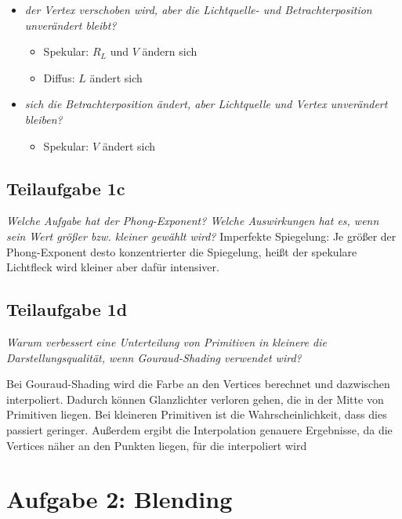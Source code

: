 \documentclass[a4paper]{scrartcl}
\begin{document}
\begin{itemize}
    \item \textit{der Vertex verschoben wird, aber die Lichtquelle- und
          Betrachterposition unverändert bleibt?}
          \begin{itemize}
              \item Spekular: $R_L$ und $V$ ändern sich
              \item Diffus: $L$ ändert sich
          \end{itemize}
    \item \textit{sich die Betrachterposition ändert, aber Lichtquelle und Vertex unverändert bleiben?}
          \begin{itemize}
              \item Spekular: $V$ ändert sich
          \end{itemize}
\end{itemize}

\subsection*{Teilaufgabe 1c}
\textit{Welche Aufgabe hat der Phong-Exponent? Welche Auswirkungen hat es, wenn sein
Wert größer bzw. kleiner gewählt wird?}
Imperfekte Spiegelung: Je größer der Phong-Exponent desto konzentrierter die Spiegelung, heißt der spekulare Lichtfleck wird kleiner aber dafür intensiver.

\subsection*{Teilaufgabe 1d}
\textit{Warum verbessert eine Unterteilung von Primitiven in kleinere die Darstellungsqualität, wenn Gouraud-Shading verwendet wird?}

Bei Gouraud-Shading wird die Farbe an den Vertices berechnet und dazwischen
interpoliert. Dadurch können Glanzlichter verloren gehen, die in der Mitte von
Primitiven liegen. Bei kleineren Primitiven ist die Wahrscheinlichkeit, dass
dies passiert geringer. Außerdem ergibt die Interpolation genauere Ergebnisse,
da die Vertices näher an den Punkten liegen, für die interpoliert wird

\section*{Aufgabe 2: Blending}
\end{document}
